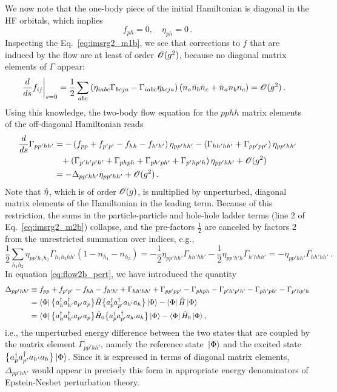 {We now note that the one-body piece of the initial Hamiltonian is diagonal in 
the HF orbitals, which implies
\begin{equation}
  f_{ph}=0,\quad \eta_{ph}=0\,.
\end{equation} 
Inspecting the Eq.~\eqref{eq:imsrg2_m1b}, we see that corrections 
to $f$ that are induced by the flow are at least of order $\mathcal{O}(g^2)$, 
because no diagonal matrix elements of $\Gamma$ appear:
\begin{align}
  \left.\totd{}{s}f_{ij}\right|_{s=0} &=
    \frac{1}{2}\sum_{abc}
    \left(\eta_{iabc}\Gamma_{bcja}-\Gamma_{iabc}\eta_{bcja}\right)\left(n_{a}\bar{n}_{b}\bar{n}_{c}+\bar{n}_{a}n_{b}n_{c}\right)=\OC(g^2)\,.\label{eq:flow1b_pert}
\end{align}
Using this knowledge, the two-body flow equation for the $pphh$ matrix elements 
of the off-diagonal Hamiltonian reads
\begin{align}
  \totd{}{s}\Gamma_{pp'hh'}&=  
  -\left(f_{pp}+f_{p'p'}-f_{hh}-f_{h'h'}\right)\eta_{pp'hh'}
  -\left(\Gamma_{hh'hh'}+\Gamma_{pp'pp'}\right)\eta_{pp'hh'}
  \notag\\
  &\hphantom{=}
    +\left(\Gamma_{p'h'p'h'}+\Gamma_{phph}+\Gamma_{ph'ph'}+\Gamma_{p'hp'h}
     \right)\eta_{pp'hh'} + \OC(g^2)
  \notag\\
  &=-\Delta_{pp'hh'}\eta_{pp'hh'} + \OC(g^2)\,.\label{eq:flow2b_pert}
\end{align}
Note that $\hat{\eta}$, which is of order $\mathcal{O}(g)$, is multiplied
by unperturbed, diagonal matrix elements of the Hamiltonian 
in the leading term. Because of this restriction, the sums
in the particle-particle and hole-hole ladder terms (line 2 of Eq.~\eqref{eq:imsrg2_m2b})
collapse, and the pre-factors $\tfrac{1}{2}$ are canceled by 
factors $2$ from the unrestricted summation over indices, e.g.,
\begin{equation}
  \frac{1}{2}\sum_{h_1h_2}\eta_{pp'h_1h_2}\Gamma_{h_1h_2hh'}(1-n_{h_1}-n_{h_2})
  =-\frac{1}{2}\eta_{pp'hh'}\Gamma_{hh'hh'}-\frac{1}{2}\eta_{pp'h'h}\Gamma_{h'hhh'}
  =-\eta_{pp'hh'}\Gamma_{hh'hh'}\,.
\end{equation}
In equation \eqref{eq:flow2b_pert}, we have introduced the quantity 
\begin{align}
  \Delta_{pp'hh'}&\equiv
    f_{pp}+f_{p'p'}-f_{hh}-f_{h'h'} + \Gamma_{hh'hh'}+\Gamma_{pp'pp'}
    -\Gamma_{phph}-\Gamma_{p'h'p'h'}-\Gamma_{ph'ph'}-\Gamma_{p'hp'h} \notag\\
    &=\dmatrixe{\Phi}{\nord{\aaO_{h}\aaO_{h'}\aO_{p'}\aO_{p}}\HO\nord{\aaO_{p}\aaO_{p'}\aO_{h'}\aO_{h}}}-\dmatrixe{\Phi}{\HO}\notag\\
    &=\dmatrixe{\Phi}{\nord{\aaO_{h}\aaO_{h'}\aO_{p'}\aO_{p}}\HO_0\nord{\aaO_{p}\aaO_{p'}\aO_{h'}\aO_{h}}}-\dmatrixe{\Phi}{\HO_0}\,,
    \label{eq:def_epsteinnesbet_2b}
\end{align}
i.e., the unperturbed energy difference between the two states
that are coupled by the matrix element $\Gamma_{pp'hh'}$, namely
the reference state $\,|{\Phi}\rangle$ and the excited state $\big\{a^\dag_{p}a^\dag_{p'}a_{h'}a_{h}\big\}\,|{\Phi}\rangle$.
Since it is expressed in terms of diagonal matrix elements, $\Delta_{pp'hh'}$
would appear in precisely this form in appropriate energy denominators
of Epstein-Nesbet perturbation theory. 

}
